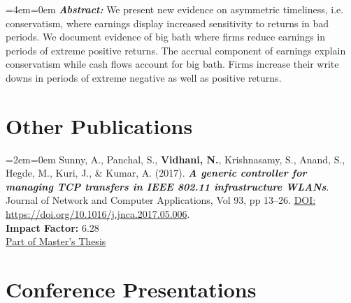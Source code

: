 \documentclass[11pt,a4paper,]{moderncv}
\begin{document}
%
  \par%
  \medskip
  \leftskip=4em\rightskip=0em%
  \noindent\ignorespaces
\textbf{\textit{Abstract:}} We present new evidence on asymmetric timeliness, i.e. conservatism, where earnings display increased sensitivity to returns in bad periods. We document evidence of big bath where firms reduce earnings in periods of extreme positive returns. The accrual component of earnings explain conservatism while cash flows account for big bath. Firms increase their write downs in periods of extreme negative as well as positive returns.
%
  \par\medskip

\endgroup

\hypertarget{other-publications}{%
\section{Other Publications}\label{other-publications}}

\begingroup
\setlength{\parindent}{-0.5in}
\setlength{\leftskip}{0.5in}

\hypertarget{refs_published}{}
%
  \par%
  \medskip
  \leftskip=2em\rightskip=0em%
  \noindent\ignorespaces
\leavevmode\hypertarget{ref-adwiser}{}
Sunny, A., Panchal, S., \textbf{Vidhani, N.}, Krishnasamy, S., Anand, S., Hegde, M., Kuri, J., \& Kumar, A. (2017). \textbf{\textit{A generic controller for managing TCP transfers in IEEE 802.11 infrastructure WLANs}}. Journal of Network and Computer Applications, Vol 93, pp 13--26. \underline{DOI:} \url{https://doi.org/10.1016/j.jnca.2017.05.006}.\\
\textbf{Impact Factor:} 6.28\\
\underline{Part of Master's Thesis}
%
  \par\medskip

\endgroup

\newpage

\hypertarget{conference-presentations}{%
\section{Conference Presentations}\label{conference-presentations}}
\end{document}
